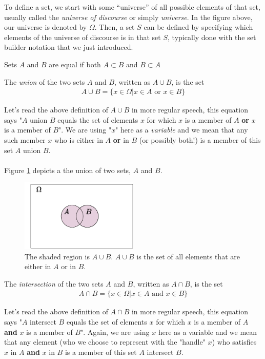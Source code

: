 To define a set, we start with some “universe” of all possible elements of that set, usually called the \textit{universe of discourse} or simply \textit{universe}. In the figure above, our universe is denoted by $\Omega$. Then, a set $S$ can be defined by specifying which elements of the universe of discourse is in that set $S$, typically done with the set builder notation that we just introduced.
\begin{definition}
Sets $A$ and $B$ are equal if both $A\subset B$ and $B\subset A$
\end{definition}

\begin{definition} \index{$\cup$}
The \textit{union} of the two sets $A$ and $B$, written as $A\cup B$, is the set
\begin{align}
    A\cup B = \{x\in \Omega |x\in A \text{ or } x\in B \} \nonumber
\end{align}
\end{definition}
Let's read the above definition of $A\cup B$ in more regular speech, this equation says "$A$ union $B$ equals the set of elements $x$ for which $x$ is a member of $A$ \textbf{or} $x$ is a member of $B$". We are using "$x$" here as a \textit{variable} and we mean that any such member $x$ who is either in $A$ \textbf{or} in $B$ (or possibly both!) is a member of this set $A$ union $B$. \\ \\
Figure \ref{fig:set_union_example} depicts a the union of two sets, $A$ and $B$.
\begin{figure}[h!]
    \centering
    \includegraphics[width=0.5\textwidth]{Figures/Set_Union.pdf}
    \caption{The shaded region is $A\cup B$. $A\cup B$ is the set of all elements that are either in $A$ or in $B$.}
    \label{fig:set_union_example}
\end{figure}
\begin{definition}\index{$\cap$}
The \textit{intersection} of the two sets $A$ and $B$, written as $A\cap B$, is the set
\begin{align}
    A\cap B=\{x \in \Omega |x\in A \text{ and } x\in B \} \nonumber
\end{align}
\end{definition}
Let's read the above definition of $A\cap B$ in more regular speech, this equation says "$A$ intersect $B$ equals the set of elements $x$ for which $x$ is a member of $A$ \textbf{and} $x$ is a member of $B$". Again, we are using $x$ here as a variable and we mean that any element (who we choose to represent with the "handle" $x$) who satisfies $x$ in $A$ \textbf{and} $x$ in $B$ is a member of this set $A$ intersect $B$.\\ \\

